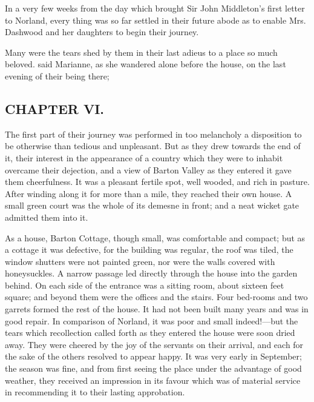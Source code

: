 In a very few weeks from the day which brought Sir John Middleton's first letter to Norland, every thing was so far settled in their future abode as to enable Mrs. Dashwood and her daughters to begin their journey.

Many were the tears shed by them in their last adieus to a place so much beloved.  said Marianne, as she wandered alone before the house, on the last evening of their being there; 

\subsection[chapter-vi.]{\useURL[url6][][][]\from[url6]CHAPTER VI.}

The first part of their journey was performed in too melancholy a disposition to be otherwise than tedious and unpleasant. But as they drew towards the end of it, their interest in the appearance of a country which they were to inhabit overcame their dejection, and a view of Barton Valley as they entered it gave them cheerfulness. It was a pleasant fertile spot, well wooded, and rich in pasture. After winding along it for more than a mile, they reached their own house. A small green court was the whole of its demesne in front; and a neat wicket gate admitted them into it.

As a house, Barton Cottage, though small, was comfortable and compact; but as a cottage it was defective, for the building was regular, the roof was tiled, the window shutters were not painted green, nor were the walls covered with honeysuckles. A narrow passage led directly through the house into the garden behind. On each side of the entrance was a sitting room, about sixteen feet square; and beyond them were the offices and the stairs. Four bed-rooms and two garrets formed the rest of the house. It had not been built many years and was in good repair. In comparison of Norland, it was poor and small indeed!---but the tears which recollection called forth as they entered the house were soon dried away. They were cheered by the joy of the servants on their arrival, and each for the sake of the others resolved to appear happy. It was very early in September; the season was fine, and from first seeing the place under the advantage of good weather, they received an impression in its favour which was of material service in recommending it to their lasting approbation.

